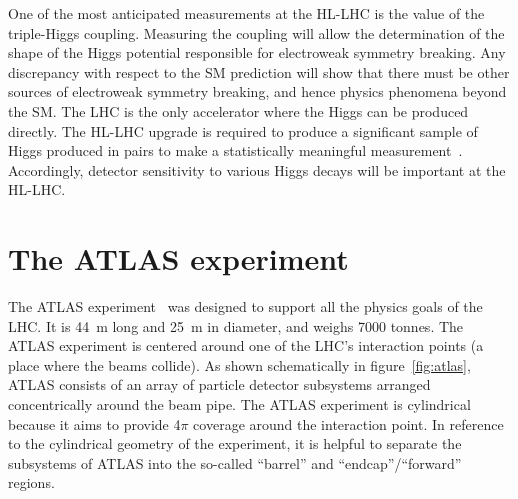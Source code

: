 One of the most anticipated measurements at the HL-LHC is the value of the triple-Higgs coupling. Measuring the coupling will allow the determination of the shape of the Higgs potential responsible for electroweak symmetry breaking. Any discrepancy with respect to the SM prediction will show that there must be other sources of electroweak symmetry breaking, and hence physics phenomena beyond the SM. The LHC is the only accelerator where the Higgs can be produced directly. The HL-LHC upgrade is required to produce a significant sample of Higgs produced in pairs to make a statistically meaningful measurement~\cite{dainese_physics_2018, cepeda_report_2018}. Accordingly, detector sensitivity to various Higgs decays will be important at the HL-LHC.


\section{The ATLAS experiment}
\label{sec:atlas}

The ATLAS experiment~\cite{collaboration_atlas_2008} was designed to support all the physics goals of the LHC. It is \SI{44}{\meter} long and \SI{25}{\meter} in diameter, and weighs 7000 tonnes. The ATLAS experiment is centered around one of the LHC's interaction points (a place where the beams collide). As shown schematically in figure~\ref{fig:atlas}, ATLAS consists of an array of particle detector subsystems arranged concentrically around the beam pipe.  The ATLAS experiment is cylindrical because it aims to provide 4$\pi$ coverage around the interaction point. In reference to the cylindrical geometry of the experiment, it is helpful to separate the subsystems of ATLAS into the so-called ``barrel'' and ``endcap''/``forward'' regions.

